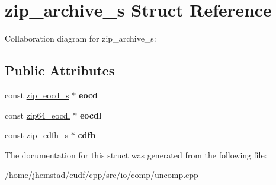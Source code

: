 \hypertarget{structzip__archive__s}{}\section{zip\+\_\+archive\+\_\+s Struct Reference}
\label{structzip__archive__s}


Collaboration diagram for zip\+\_\+archive\+\_\+s\+:
\subsection*{Public Attributes}
\begin{DoxyCompactItemize}
\item 
const \hyperlink{structzip__eocd__s}{zip\+\_\+eocd\+\_\+s} $\ast$ {\bfseries eocd}\hypertarget{structzip__archive__s_a866543d833a419bea942c20df6a3e62c}{}\label{structzip__archive__s_a866543d833a419bea942c20df6a3e62c}

\item 
const \hyperlink{structzip64__eocdl}{zip64\+\_\+eocdl} $\ast$ {\bfseries eocdl}\hypertarget{structzip__archive__s_a42e4a8ad827df30d97c61ef269af1b82}{}\label{structzip__archive__s_a42e4a8ad827df30d97c61ef269af1b82}

\item 
const \hyperlink{structzip__cdfh__s}{zip\+\_\+cdfh\+\_\+s} $\ast$ {\bfseries cdfh}\hypertarget{structzip__archive__s_a6b51b1ef1622a5280873c502e9b59058}{}\label{structzip__archive__s_a6b51b1ef1622a5280873c502e9b59058}

\end{DoxyCompactItemize}


The documentation for this struct was generated from the following file\+:\begin{DoxyCompactItemize}
\item 
/home/jhemstad/cudf/cpp/src/io/comp/uncomp.\+cpp\end{DoxyCompactItemize}

